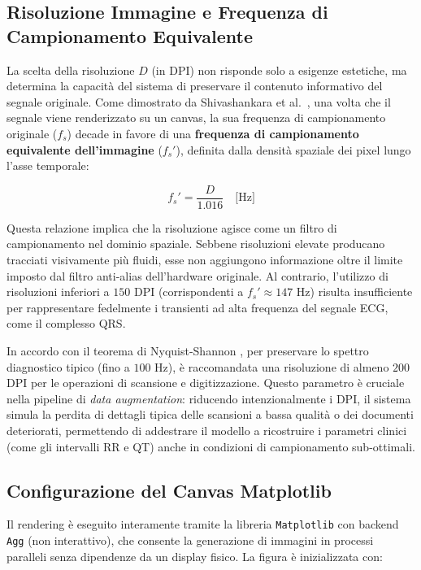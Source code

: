\subsection{Risoluzione Immagine e Frequenza di Campionamento Equivalente}

La scelta della risoluzione $D$ (in DPI) non risponde solo a esigenze estetiche, ma determina la capacità del sistema di preservare il contenuto informativo del segnale originale. Come dimostrato da Shivashankara et al.~\cite{ecgimagekitpaper}, una volta che il segnale viene renderizzato su un canvas, la sua frequenza di campionamento originale ($f_s$) decade in favore di una \textbf{frequenza di campionamento equivalente dell'immagine} ($f_s'$), definita dalla densità spaziale dei pixel lungo l'asse temporale:

\begin{equation}
f_s' = \frac{D}{1.016} \quad \text{[Hz]}
\end{equation}

Questa relazione implica che la risoluzione agisce come un filtro di campionamento nel dominio spaziale. Sebbene risoluzioni elevate producano tracciati visivamente più fluidi, esse non aggiungono informazione oltre il limite imposto dal filtro anti-alias dell'hardware originale. Al contrario, l'utilizzo di risoluzioni inferiori a $150$ DPI (corrispondenti a $f_s' \approx 147$ Hz) risulta insufficiente per rappresentare fedelmente i transienti ad alta frequenza del segnale ECG, come il complesso QRS.

In accordo con il teorema di Nyquist-Shannon \cite{Nyquist1928}, per preservare lo spettro diagnostico tipico (fino a $100$ Hz), è raccomandata una risoluzione di almeno $200$ DPI per le operazioni di scansione e digitizzazione. Questo parametro è cruciale nella pipeline di \textit{data augmentation}: riducendo intenzionalmente i DPI, il sistema simula la perdita di dettagli tipica delle scansioni a bassa qualità o dei documenti deteriorati, permettendo di addestrare il modello a ricostruire i parametri clinici (come gli intervalli RR e QT) anche in condizioni di campionamento sub-ottimali.

\subsection{Configurazione del Canvas Matplotlib}

Il rendering è eseguito interamente tramite la libreria \texttt{Matplotlib} con backend \texttt{Agg} (non interattivo), che consente la generazione di immagini in processi paralleli senza dipendenze da un display fisico. La figura è inizializzata con:

